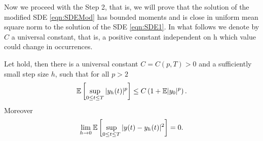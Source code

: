 	Now we proceed with the Step 2, that is,  we will prove that the solution  of the modified
SDE \eqref{eqn:SDEMod} has bounded moments and is close in uniform mean square norm to the solution of the SDE 
\eqref{eqn:SDE1}. In what follows we denote by $C$  a universal constant, that is, a positive constant
independent on h which value could change in occurrences.


\begin{lem}\label{lem:BoundAndConvergenceOfyh}
	Let  hold, then there is a universal 
	constant $C=C(p,T)>0$ and a sufficiently small
	step size $h$, such that for all $p>2$
	\begin{equation}\label{eqn:yh-MomentBounds}
		\mathbb{E}\left[
			\sup_{0\leq t \leq T}
				|y_h(t)|^p
		\right]
		\leq
			C
		\left( 
			1+\mathbb{E}|y_0|^p
		\right).
	\end{equation}
	Moreover
	\begin{equation}\label{eqn:yh-convergence}
	\lim_{h \to 0}
	\mathbb{E}\left[
	\sup_{0\leq t \leq T}
	|y(t)-y_h(t)|^2
	\right]=0.
	\end{equation}
\end{lem}
